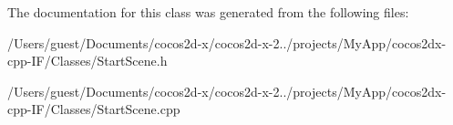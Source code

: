 The documentation for this class was generated from the following files\-:\begin{DoxyCompactItemize}
\item 
/\-Users/guest/\-Documents/cocos2d-\/x/cocos2d-\/x-\/2../projects/\-My\-App/cocos2dx-\/cpp-\/\-I\-F/\-Classes/Start\-Scene.\-h\item 
/\-Users/guest/\-Documents/cocos2d-\/x/cocos2d-\/x-\/2../projects/\-My\-App/cocos2dx-\/cpp-\/\-I\-F/\-Classes/Start\-Scene.\-cpp\end{DoxyCompactItemize}
